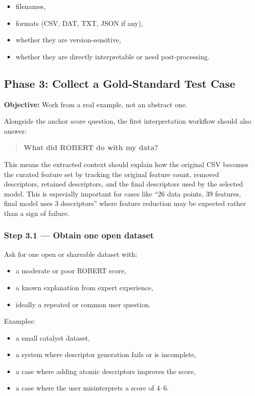 \documentclass[11pt]{article}
\begin{document}
\begin{itemize}
    \item filenames,
    \item formats (CSV, DAT, TXT, JSON if any),
    \item whether they are version-sensitive,
    \item whether they are directly interpretable or need post-processing.
\end{itemize}

\subsection{Phase 3: Collect a Gold-Standard Test Case}
\textbf{Objective:} Work from a real example, not an abstract one.

Alongside the anchor score question, the first interpretation workflow should also answer:

\begin{quote}
\textbf{What did ROBERT do with my data?}
\end{quote}

This means the extracted context should explain how the original CSV becomes the curated
feature set by tracking the original feature count, removed descriptors, retained
descriptors, and the final descriptors used by the selected model. This is especially
important for cases like ``26 data points, 39 features, final model uses 3 descriptors''
where feature reduction may be expected rather than a sign of failure.

\subsubsection*{Step 3.1 --- Obtain one open dataset}
Ask for one open or shareable dataset with:

\begin{itemize}
    \item a moderate or poor ROBERT score,
    \item a known explanation from expert experience,
    \item ideally a repeated or common user question.
\end{itemize}

Examples:
\begin{itemize}
    \item a small catalyst dataset,
    \item a system where descriptor generation fails or is incomplete,
    \item a case where adding atomic descriptors improves the score,
    \item a case where the user misinterprets a score of 4--6.
\end{itemize}
\end{document}
